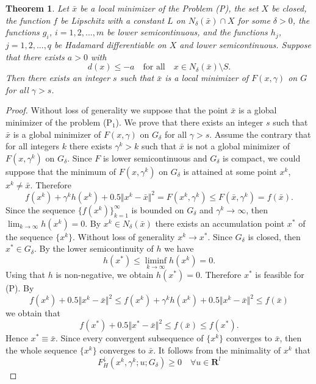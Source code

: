 \documentclass[12pt]{article}
\newtheorem{theorem}{Theorem}[section]
\def\E{\mathbf R^l}
\def\ld#1{#1^{\downarrow}_{H}}
\newcommand{\norm}[1]{\Vert#1\Vert}
\begin{document}
\begin{theorem}\label{th-penalty}
Let $\bar x$ be a local minimizer  of the Problem {\rm (P)}, the set $X$ be
closed, the function $f$ be Lipschitz with a constant $L$ on
$N_\delta(\bar x)\cap X$ for some $\delta>0$, the functions $g_i$, $i=1,2,...,m$
be lower semicontinuous, and the functions $h_j$, $j=1,2,...,q$ be Hadamard
differentiable on $X$ and lower semicontinuous. Suppose that there exists $a>0$
with
\begin{equation}\label{6}
d(x)\le -a\quad\textrm{for all}\quad x\in N_\delta(\bar x)\setminus S.
\end{equation}
Then  there exists an integer $s$ such that $\bar x$ is a local minimizer
of $F(x,\gamma)$ on $G$ for all $\gamma>s$.
\end{theorem}
\begin{proof}
Without loss of generality we suppose that
the point $\bar x$ is a global minimizer of the problem (P$_1$).
We prove that there exists an integer $s$ such that $\bar x$ is a global
minimizer of $F(x,\gamma)$ on $G_\delta$ for all $\gamma>s$.
Assume the contrary that for all integers $k$ there exists $\gamma^k>k$
such that $\bar x$ is not a global minimizer of $F(x,\gamma^k)$ on $G_\delta$. 
Since $F$ is lower semicontinuous and $G_\delta$ is compact, we could suppose
that the minimum of $F(x,\gamma^k)$ on $G_\delta$ is attained at some point
$x^k$, $x^k\ne\bar x$. Therefore
\begin{equation}\label{p1}
f(x^k)+\gamma^k h(x^k)+0.5\norm{x^k-\bar x}^2=F(x^k,\gamma^k)\le F(\bar x,\gamma^k)=f(\bar x).
\end{equation}
Since the sequence $\{f(x^k)\}_{k=1}^\infty$ is bounded on $G_\delta$ and
$\gamma^k\to\infty$, then $\lim_{k\to\infty} h(x^k)=0$. By $x^k\in N_\delta(\bar x)$
there exists an accumulation point $x^*$ of the sequence $\{x^k\}$.
Without loss of generality $x^k\to x^*$. Since $G_\delta$ is closed, then $x^*\in G_\delta$.
By the lower semicontinuity of $h$ we have
\[
h(x^*)\le\liminf_{k\to\infty}h(x^k)=0.
\]
Using that $h$ is non-negative, we obtain $h(x^*)=0$.
Therefore $x^*$ is feasible for (P). By
\[
f(x^k)+0.5\norm{x^k-\bar x}^2\le f(x^k)+\gamma^k h(x^k)+0.5\norm{x^k-\bar x}^2\le f(\bar x)
\]
we obtain that
\[
f(x^*)+0.5\norm{x^*-\bar x}^2\le f(\bar x)\le f(x^*).
\]
Hence
$x^*\equiv\bar x$. Since every convergent subsequence of $\{x^k\}$ converges
to $\bar x$, then the whole sequence $\{x^k\}$ converges to $\bar x$.
It follows from the minimality of $x^k$ that
\begin{equation}\label{3}
\ld F(x^k,\gamma^k;u;G_\delta)\ge 0\quad\forall u\in \E
\end{equation}


\end{proof}
\end{document}

